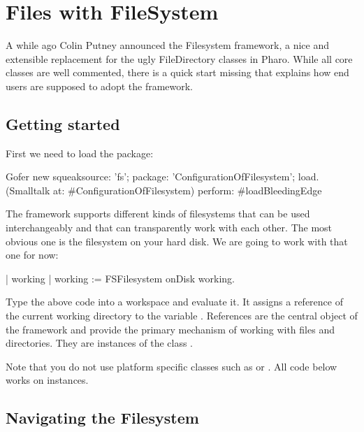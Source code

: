 \documentclass[a4paper,10pt,twoside]{book}
\begin{document}
\fi
\sloppy
\chapter{Files with FileSystem }
\chapterauthor{\authorsteph{}}

A while ago Colin Putney announced the Filesystem framework, a nice and extensible replacement for the ugly FileDirectory classes in Pharo. While all core classes are well commented, there is a quick start missing that explains how end users are supposed to adopt the framework. 

\section{Getting started}

First we need to load the package:

\begin{code}{}
Gofer new
  squeaksource: 'fs'; 
  package: 'ConfigurationOfFilesystem';
  load.
(Smalltalk at: #ConfigurationOfFilesystem) perform: #loadBleedingEdge
\end{code}     

The framework supports different kinds of filesystems that can be used interchangeably and that can transparently work with each other. The most obvious one is the filesystem on your hard disk. We are going to work with that one for now:

\begin{code}{}
| working |
working := FSFilesystem onDisk working.
\end{code} 

Type  the above code into a workspace and evaluate it. It assigns a reference of the current working directory to the variable . References are the central object of the framework and provide the primary mechanism of working with files and directories. They are instances of the class .

Note that you do not use platform specific classes such as  or . All code below works on  instances.


\section{Navigating the Filesystem}
\end{document}
